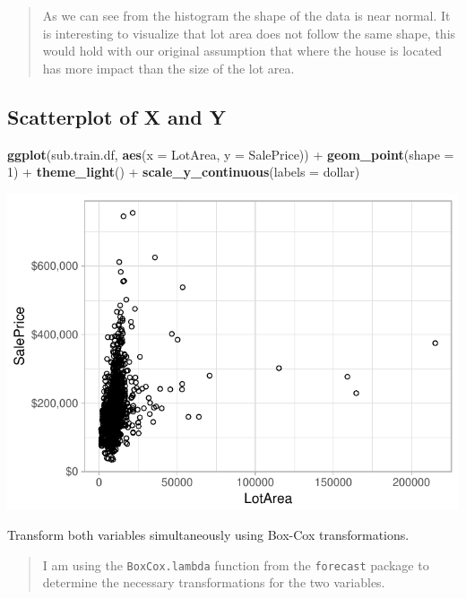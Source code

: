 \documentclass[]{article}
\newenvironment{Shaded}{\begin{snugshade}}{\end{snugshade}}
\newcommand{\KeywordTok}[1]{\textcolor[rgb]{0.13,0.29,0.53}{\textbf{{#1}}}}
\newcommand{\DataTypeTok}[1]{\textcolor[rgb]{0.13,0.29,0.53}{{#1}}}
\newcommand{\DecValTok}[1]{\textcolor[rgb]{0.00,0.00,0.81}{{#1}}}
\newcommand{\StringTok}[1]{\textcolor[rgb]{0.31,0.60,0.02}{{#1}}}
\newcommand{\NormalTok}[1]{{#1}}
\begin{document}
\begin{quote}
As we can see from the histogram the shape of the data is near normal.
It is interesting to visualize that lot area does not follow the same
shape, this would hold with our original assumption that where the house
is located has more impact than the size of the lot area.
\end{quote}

\newpage

\subsection{Scatterplot of X and Y}\label{scatterplot-of-x-and-y}

\begin{Shaded}
\begin{Highlighting}[]
\KeywordTok{ggplot}\NormalTok{(sub.train.df, }\KeywordTok{aes}\NormalTok{(}\DataTypeTok{x =} \NormalTok{LotArea, }\DataTypeTok{y =} \NormalTok{SalePrice)) +}\StringTok{ }\KeywordTok{geom_point}\NormalTok{(}\DataTypeTok{shape =} \DecValTok{1}\NormalTok{) +}\StringTok{ }
\StringTok{    }\KeywordTok{theme_light}\NormalTok{() +}\StringTok{ }\KeywordTok{scale_y_continuous}\NormalTok{(}\DataTypeTok{labels =} \NormalTok{dollar)}
\end{Highlighting}
\end{Shaded}

\includegraphics{Final_Project_files/figure-latex/scatter plot-1.pdf}

Transform both variables simultaneously using Box-Cox transformations.

\begin{quote}
I am using the \texttt{BoxCox.lambda} function from the
\texttt{forecast} package to determine the necessary transformations for
the two variables.
\end{quote}
\end{document}
